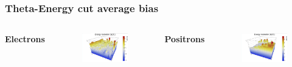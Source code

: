 \documentclass{beamer}
\begin{document}
		\begin{frame}
			\frametitle{Theta-Energy cut average bias}
			\begin{columns}
				\centering
				\Large \textbf{Electrons}
				\begin{figure}
					\centering
					\includegraphics[width = 0.95 \linewidth]{images/c_e_theta_energy.png}
				\end{figure}
				\centering
				\Large \textbf{Positrons}
				\begin{figure}
					\centering
					\includegraphics[width = 0.95 \linewidth]{images/c_p_theta_energy.png}
				\end{figure}
			\end{columns}
		\end{frame}
\end{document}
